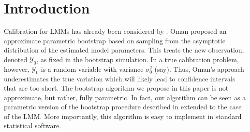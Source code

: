 \documentclass[useAMS,usenatbib,usegraphicx,referee]{biom}\usepackage[]{graphicx}\usepackage[]{color}
\begin{document}
%

\section{Introduction}
\label{sec:intro}
Calibration for LMMs has already been considered by \citet{oman_calibration_1998}. Oman proposed an approximate parametric bootstrap based on sampling from the asymptotic distribution of the estimated model parameters. This treats the new observation, denoted $\mathcal{Y}_0$, as fixed in the bootstrap simulation. In a true calibration problem, however, $\mathcal{Y}_0$ is a random variable with variance $\sigma_0^2$ (say). Thus, Oman's approach underestimates the true variation which will likely lead to confidence intervals that are too short. The bootstrap algorithm we propose in this paper is not approximate, but rather, fully parametric. In fact, our algorithm can be seen as a parametric version of the bootstrap procedure described in \citet{jones_bootstrapping_1999} extended to the case of the LMM. More importantly, this algorithm is easy to implement in standard statistical software.
\end{document}
